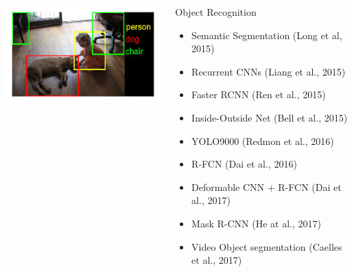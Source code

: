 \begin{frame}
    \begin{columns}            
        \begin{column}{0.6\textwidth}
            \begin{overlayarea}{\textwidth}{\textheight}
                \vspace{0.2in}
                \includegraphics[width=1\linewidth]{images/or}
            \end{overlayarea}
        \end{column}
        \begin{column}{0.4\textwidth}
            \begin{overlayarea}{\textwidth}{\textheight}
                \begin{block}{Object Recognition}
                    \begin{itemize}
                      \item Semantic Segmentation (Long et al, 2015) \cite{DBLP:conf/cvpr/LongSD15}
                      \item Recurrent CNNs (Liang et al., 2015) \cite{DBLP:conf/cvpr/LiangH15}
                      \item Faster RCNN (Ren et al., 2015) \cite{DBLP:journals/pami/RenHG017}
                      \item Inside-Outside Net (Bell et al., 2015) \cite{DBLP:journals/corr/BellZBG15}
                      \item YOLO9000 (Redmon et al., 2016) \cite{DBLP:journals/corr/RedmonF16}
                      \item R-FCN (Dai et al., 2016) \cite{DBLP:conf/nips/DaiLHS16}
                      \item Deformable CNN + R-FCN (Dai et al., 2017) \cite{DBLP:journals/corr/DaiQXLZHW17}
                      \item Mask R-CNN (He at al., 2017) \cite{DBLP:conf/iccv/HeGDG17}
                      \item Video Object segmentation (Caelles et al., 2017) \cite{DBLP:conf/cvpr/CaellesMPLCG17}
                    \end{itemize}
                \end{block}
            \end{overlayarea}
        \end{column}
    \end{columns}
\end{frame}

